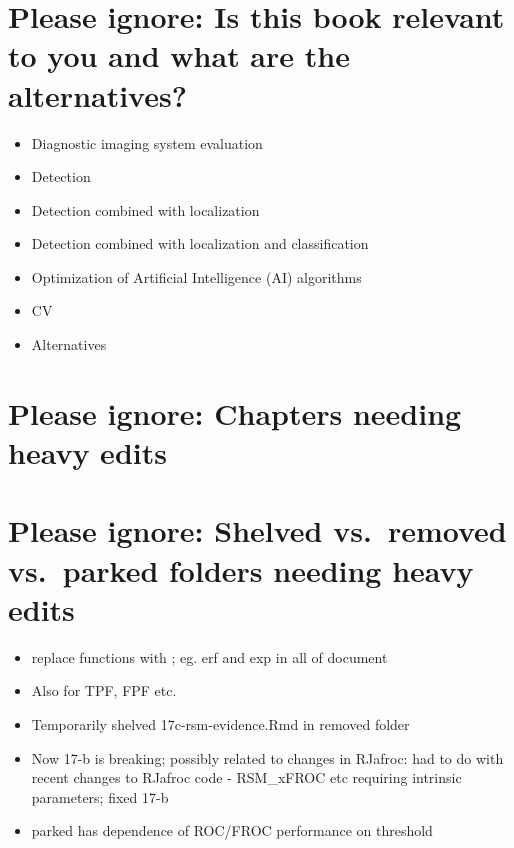 \documentclass[
]{book}
\providecommand{\tightlist}{%
  \setlength{\itemsep}{0pt}\setlength{\parskip}{0pt}}
\begin{document}
\hypertarget{please-ignore-is-this-book-relevant-to-you-and-what-are-the-alternatives}{%
\section{Please ignore: Is this book relevant to you and what are the alternatives?}\label{please-ignore-is-this-book-relevant-to-you-and-what-are-the-alternatives}}

\begin{itemize}
\tightlist
\item
  Diagnostic imaging system evaluation
\item
  Detection
\item
  Detection combined with localization
\item
  Detection combined with localization and classification
\item
  Optimization of Artificial Intelligence (AI) algorithms
\item
  CV
\item
  Alternatives
\end{itemize}

\hypertarget{please-ignore-chapters-needing-heavy-edits}{%
\section{Please ignore: Chapters needing heavy edits}\label{please-ignore-chapters-needing-heavy-edits}}

\hypertarget{please-ignore-shelved-vs.-removed-vs.-parked-folders-needing-heavy-edits}{%
\section{Please ignore: Shelved vs.~removed vs.~parked folders needing heavy edits}\label{please-ignore-shelved-vs.-removed-vs.-parked-folders-needing-heavy-edits}}

\begin{itemize}
\tightlist
\item
  replace functions with \text{}; eg. erf and exp in all of document
\item
  Also for TPF, FPF etc.
\item
  Temporarily shelved 17c-rsm-evidence.Rmd in removed folder
\item
  Now 17-b is breaking; possibly related to changes in RJafroc: had to do with recent changes to RJafroc code - RSM\_xFROC etc requiring intrinsic parameters; fixed 17-b
\item
  parked has dependence of ROC/FROC performance on threshold
\end{itemize}
\end{document}
